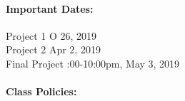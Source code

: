 \documentclass[11pt]{article}
\begin{document}
\paragraph{Important Dates:}
\begin{center} \begin{minipage}{3.8in}
\begin{flushleft}
Project 1    \dotfill  O 26, 2019\\
Project 2  \dotfill  Apr 2, 2019\\
Final Project    :00-10:00pm, May 3, 2019\\
\end{flushleft}
\end{minipage}
\end{center}

\paragraph{Class Policies:}
\end{document}
